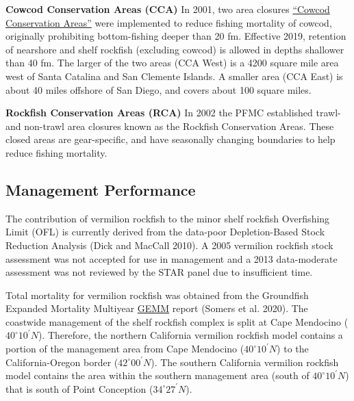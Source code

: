 \documentclass[11pt,
  english,
]{article}
\begin{document}
\textbf{Cowcod Conservation Areas (CCA)} In 2001, two area closures {\href{https://nrm.dfg.ca.gov/FileHandler.ashx?DocumentID=36132\&inline}{``Cowcod Conservation Areas''}\leavevmode\tagmcend\tagstructend} were implemented to reduce fishing mortality of cowcod, originally prohibiting bottom-fishing deeper than 20 fm. Effective 2019, retention of nearshore and shelf rockfish (excluding cowcod) is allowed in depths shallower than 40 fm. The larger of the two areas (CCA West) is a 4200 square mile area west of Santa Catalina and San Clemente Islands. A smaller area (CCA East) is about 40 miles offshore of San Diego, and covers about 100 square miles.

\textbf{Rockfish Conservation Areas (RCA)} In 2002 the PFMC established trawl- and non-trawl area closures known as the Rockfish Conservation Areas. These closed areas are gear-specific, and have seasonally changing boundaries to help reduce fishing mortality.


\hypertarget{management-performance-1}{%
\subsection{Management Performance}\label{management-performance-1}}

\leavevmode\tagmcend\tagstructend

The contribution of vermilion rockfish to the minor shelf rockfish Overfishing Limit (OFL) is currently derived from the data-poor Depletion-Based Stock Reduction Analysis {(Dick and MacCall 2010)\leavevmode\tagmcend\tagstructend}. A 2005 vermilion rockfish stock assessment was not accepted for use in management and a 2013 data-moderate assessment was not reviewed by the STAR panel due to insufficient time.

Total mortality for vermilion rockfish was obtained from the Groundfish Expanded Mortality Multiyear {\href{https://www.nwfsc.noaa.gov/data/api/v1/source/observer.gemm_fact/selection.xlsx}{GEMM}\leavevmode\tagmcend\tagstructend} report {(Somers et al. 2020)\leavevmode\tagmcend\tagstructend}. The coastwide management of the shelf rockfish complex is split at Cape Mendocino ($40^\circ 10^\prime N$). Therefore, the northern California vermilion rockfish model contains a portion of the management area from Cape Mendocino ($40^\circ 10^\prime N$) to the California-Oregon border ($42^\circ 00^\prime N$). The southern California vermilion rockfish model contains the area within the southern management area (south of $40^\circ 10^\prime N$) that is south of Point Conception ($34^\circ 27^\prime N$).
\end{document}
